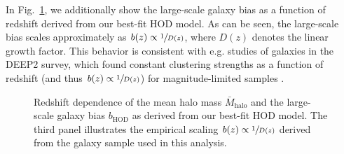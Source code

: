 \documentclass[a4paper,11pt]{article}
\begin{document}
      In Fig.~\ref{fig:HOD-redshift}, we additionally show the large-scale galaxy bias as a function of redshift derived from our best-fit HOD model. As can be seen, the large-scale bias scales approximately as $b(z) \propto \sfrac{1}{D(z)}$, where $D(z)$ denotes the linear growth factor. This behavior is consistent with e.g. studies of galaxies in the DEEP2 survey, which found constant clustering strengths as a function of redshift (and thus $b(z) \propto \sfrac{1}{D(z)}$) for magnitude-limited samples \cite{Coil:2004}.
      \begin{figure}
        \begin{center}
          \caption{Redshift dependence of the mean halo mass $\bar{M}_{\mathrm{halo}}$ and the large-scale galaxy bias $b_{\mathrm{HOD}}$ as derived from our best-fit HOD model. The third panel illustrates the empirical scaling $b(z) \propto \sfrac{1}{D(z)}$ derived from the galaxy sample used in this analysis.}
          \label{fig:HOD-redshift}
        \end{center}
      \end{figure}
\end{document}
